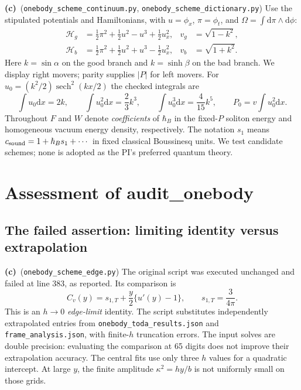 \documentclass[11pt,a4paper]{article}
\newcommand{\Lc}{\textbf{(c)}\ }
\newcommand{\dd}{\mathrm d}
\newcommand{\ccheck}{\texttt{onebody\_\allowbreak scheme\_\allowbreak continuum.py}}
\newcommand{\dcheck}{\texttt{onebody\_\allowbreak scheme\_\allowbreak dictionary.py}}
\newcommand{\echeck}{\texttt{onebody\_\allowbreak scheme\_\allowbreak edge.py}}
\begin{document}
\Lc (\ccheck, \dcheck) Use the stipulated potentials and Hamiltonians,
with $u=\phi_x$, $\pi=\phi_t$, and $\Omega=\int\dd\pi\wedge\dd\phi$:
\begin{align}
 \mathcal H_g&=\tfrac12\pi^2+\tfrac12u^2-u^3+\tfrac12u_x^2,
 &v_g&=\sqrt{1-k^2},\\
 \mathcal H_b&=\tfrac12\pi^2+\tfrac12u^2+u^3-\tfrac12u_x^2,
 &v_b&=\sqrt{1+k^2}.
\end{align}
Here $k=\sin\alpha$ on the good branch and $k=\sinh\beta$ on the bad
branch. We display right movers; parity supplies $|P|$ for left movers.
For $u_0=(k^2/2)\operatorname{sech}^2(kx/2)$ the checked integrals are
\begin{equation}\label{eq:moments}
 \int u_0\dd x=2k,\qquad \int u_0^2\dd x=\frac23k^3,
 \qquad \int u_0^3\dd x=\frac4{15}k^5,\qquad
 P_0=v\int u_0^2\dd x.
\end{equation}
Throughout $F$ and $W$ denote \emph{coefficients} of $\hbar_B$ in the
fixed-$P$ soliton energy and homogeneous vacuum energy density, respectively.
The notation $s_1$ means $c_{\rm sound}=1+\hbar_Bs_1+\cdots$ in fixed
classical Boussinesq units. We test candidate schemes; none is adopted as the
PI's preferred quantum theory.

\section{Assessment of audit\_onebody}\label{sec:assessment}
\subsection{The failed assertion: limiting identity versus extrapolation}
\Lc (\echeck) The original script was executed unchanged and failed at
line 383, as reported. Its comparison is
\begin{equation}\label{eq:identity}
 C_v(y)=s_{1,T}+\frac y2\{u'(y)-1\},\qquad
 s_{1,T}=\frac3{4\pi}.
\end{equation}
This is an $h\to0$ \emph{edge-limit} identity. The script substitutes
independently extrapolated entries from \texttt{onebody\_toda\_results.json}
and \texttt{frame\_analysis.json}, with finite-$h$ truncation errors.
The input solves are double precision: evaluating the comparison at 65
digits does not improve their extrapolation accuracy. The central fits use
only three $h$ values for a quadratic intercept. At large $y$, the finite
amplitude $\kappa^2=hy/b$ is not uniformly small on those grids.
\end{document}
